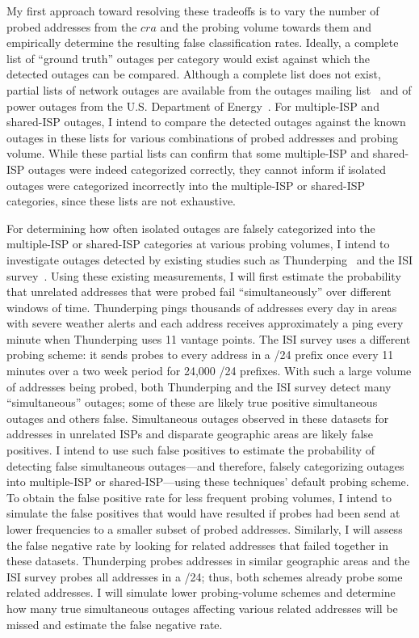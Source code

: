 My first approach toward resolving these tradeoffs is to vary the number of
probed addresses from the $cra$ and the probing volume towards them and empirically
determine the resulting false classification rates. 
Ideally, a
complete list of ``ground truth'' outages per category would
exist against which the detected outages can be
compared. Although a complete list does not exist, partial lists of
network outages are available from the outages mailing
list~\cite{outages-mailing-list} and of power outages from the
U.S. Department of Energy~\cite{power-outages-us-official-list}. For
multiple-ISP
and shared-ISP outages, I intend to compare the detected
outages against the known outages in these lists for various combinations of probed addresses and
probing volume. While these partial lists can confirm that some
multiple-ISP and shared-ISP outages were indeed
categorized correctly, they
cannot inform if isolated outages were
categorized incorrectly into the multiple-ISP or shared-ISP
categories, since these lists are not exhaustive.

For determining how often isolated outages are falsely categorized into
the multiple-ISP or shared-ISP categories at various probing volumes, 
I intend to investigate outages detected by existing studies such as
Thunderping~\cite{pingin} and the ISI survey~\cite{census-survey}.
Using these existing measurements, I will first estimate the probability that
unrelated addresses that were probed fail ``simultaneously'' over
different windows of time. Thunderping pings thousands of
addresses every day in areas with severe weather alerts and each
address receives approximately a ping every minute when Thunderping
uses 11 vantage points. The ISI survey uses a different probing scheme: it sends probes
to every address in a /24 prefix once every 11 minutes over a two week
period for 24,000 /24 prefixes. With such a large volume of addresses being
probed, both Thunderping and the ISI survey detect many ``simultaneous'' outages; some of
these are likely true positive simultaneous outages and others
false. Simultaneous outages observed in these
datasets for addresses in unrelated ISPs and disparate geographic areas are
likely false positives. I intend to use such false positives to
estimate the probability of detecting false simultaneous outages---and
therefore, falsely categorizing outages into multiple-ISP or
shared-ISP---using
these techniques' default probing scheme. To obtain the false positive
rate for less frequent probing volumes, I intend to simulate the
false positives that would have resulted if probes had been send at
lower frequencies to a smaller subset of probed addresses. Similarly,
I will assess the false negative rate by looking for related addresses
that failed together in these datasets. Thunderping probes addresses
in similar geographic areas and the ISI survey probes all addresses in
a /24; thus, both schemes already probe some related addresses. I will
simulate lower probing-volume schemes and determine how many true simultaneous
outages affecting various related addresses will be missed and estimate
the false negative rate.

